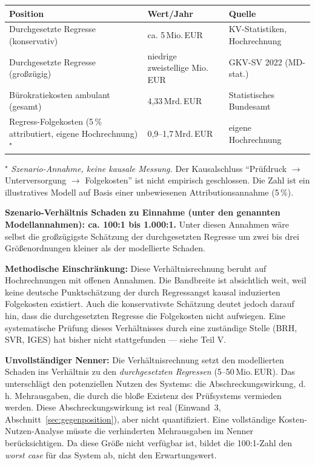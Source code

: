 \documentclass{umbruch-position}
\begin{document}
{\small
\begin{tabularx}{\textwidth}{X X X}
\toprule
\textbf{Position} & \textbf{Wert/Jahr} & \textbf{Quelle} \\
\midrule
Durchgesetzte Regresse (konservativ) & ca. 5\,Mio.\,EUR & KV-Statistiken, Hochrechnung \\
Durchgesetzte Regresse (großzügig) & niedrige zweistellige Mio.\,EUR & GKV-SV 2022 (MD-stat.) \\
Bürokratiekosten ambulant (gesamt) & 4,33\,Mrd.\,EUR & Statistisches Bundesamt \\
Regress-Folgekosten (5\,\% attributiert, eigene Hochrechnung)$^\star$ & 0,9--1,7\,Mrd.\,EUR & eigene Hochrechnung \\
\bottomrule
\end{tabularx}

\smallskip\noindent$^\star$ \textit{Szenario-Annahme, keine kausale Messung.} Der Kausalschluss ``Prüfdruck $\to$ Unterversorgung $\to$ Folgekosten'' ist nicht empirisch geschlossen. Die Zahl ist ein illustratives Modell auf Basis einer unbewiesenen Attributionsannahme (5\,\%).
}

\textbf{Szenario-Verhältnis Schaden zu Einnahme (unter den genannten Modellannahmen): ca. 100:1 bis 1.000:1.} Unter diesen Annahmen wäre selbst die großzügigste Schätzung der durchgesetzten Regresse um zwei bis drei Größenordnungen kleiner als der modellierte Schaden.

\textbf{Methodische Einschränkung:} Diese Verhältnisrechnung beruht auf Hochrechnungen mit offenen Annahmen. Die Bandbreite ist absichtlich weit, weil keine deutsche Punktschätzung der durch Regressangst kausal induzierten Folgekosten existiert. Auch die konservativste Schätzung deutet jedoch darauf hin, dass die durchgesetzten Regresse die Folgekosten nicht aufwiegen. Eine systematische Prüfung dieses Verhältnisses durch eine zuständige Stelle (BRH, SVR, IGES) hat bisher nicht stattgefunden --- siehe Teil V.

\textbf{Unvollständiger Nenner:} Die Verhältnisrechnung setzt den modellierten Schaden ins Verhältnis zu den \textit{durchgesetzten Regressen} (5--50\,Mio.\,EUR). Das unterschlägt den potenziellen Nutzen des Systems: die Abschreckungswirkung, d.\,h. Mehrausgaben, die durch die bloße Existenz des Prüfsystems vermieden werden. Diese Abschreckungswirkung ist real (Einwand~3, Abschnitt~\ref{sec:gegenposition}), aber nicht quantifiziert. Eine vollständige Kosten-Nutzen-Analyse müsste die verhinderten Mehrausgaben im Nenner berücksichtigen. Da diese Größe nicht verfügbar ist, bildet die 100:1-Zahl den \textit{worst case} für das System ab, nicht den Erwartungswert.
\end{document}
